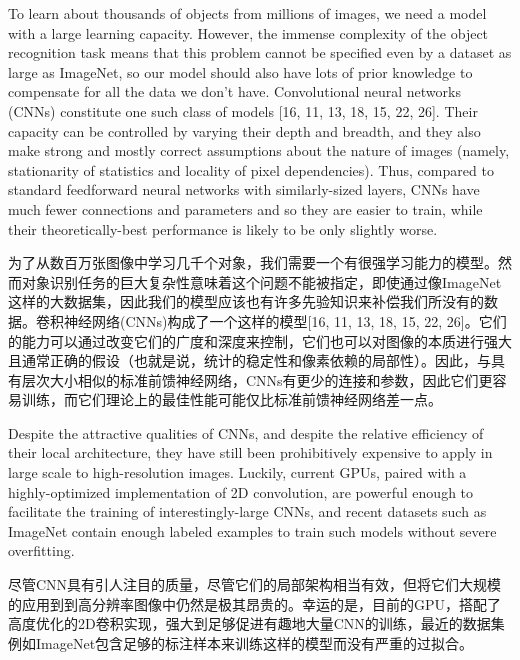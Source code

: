 \documentclass[12pt,a4paper,UTF8,twoside]{book}
\begin{document}
To learn about thousands of objects from millions of images, we need a model with a large learning capacity. However, the immense complexity of the object recognition task means that this problem cannot be specified even by a dataset as large as ImageNet, so our model should also have lots of prior knowledge to compensate for all the data we don't have. Convolutional neural networks (CNNs) constitute one such class of models {[}16, 11, 13, 18, 15, 22, 26{]}. Their capacity can be controlled by varying their depth and breadth, and they also make strong and mostly correct assumptions about the nature of images (namely, stationarity of statistics and locality of pixel dependencies). Thus, compared to standard feedforward neural networks with similarly-sized layers, CNNs have much fewer connections and parameters and so they are easier to train, while their theoretically-best performance is likely to be only slightly worse.

为了从数百万张图像中学习几千个对象，我们需要一个有很强学习能力的模型。然而对象识别任务的巨大复杂性意味着这个问题不能被指定，即使通过像ImageNet这样的大数据集，因此我们的模型应该也有许多先验知识来补偿我们所没有的数据。卷积神经网络(CNNs)构成了一个这样的模型{[}16, 11, 13, 18, 15, 22, 26{]}。它们的能力可以通过改变它们的广度和深度来控制，它们也可以对图像的本质进行强大且通常正确的假设（也就是说，统计的稳定性和像素依赖的局部性）。因此，与具有层次大小相似的标准前馈神经网络，CNNs有更少的连接和参数，因此它们更容易训练，而它们理论上的最佳性能可能仅比标准前馈神经网络差一点。

Despite the attractive qualities of CNNs, and despite the relative efficiency of their local architecture, they have still been prohibitively expensive to apply in large scale to high-resolution images. Luckily, current GPUs, paired with a highly-optimized implementation of 2D convolution, are powerful enough to facilitate the training of interestingly-large CNNs, and recent datasets such as ImageNet contain enough labeled examples to train such models without severe overfitting.

尽管CNN具有引人注目的质量，尽管它们的局部架构相当有效，但将它们大规模的应用到到高分辨率图像中仍然是极其昂贵的。幸运的是，目前的GPU，搭配了高度优化的2D卷积实现，强大到足够促进有趣地大量CNN的训练，最近的数据集例如ImageNet包含足够的标注样本来训练这样的模型而没有严重的过拟合。
\end{document}
